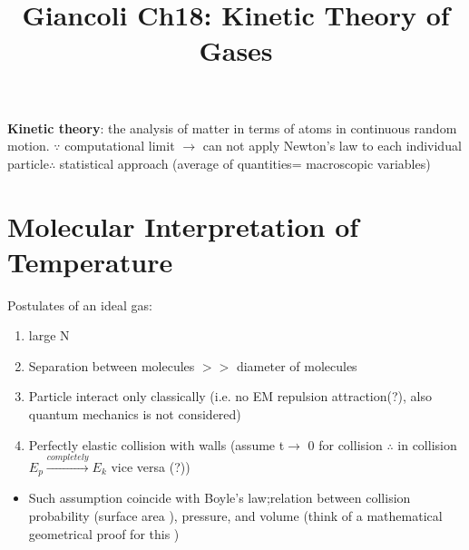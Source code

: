 \documentclass[12 pt, twoside, a4paper] {article}
\begin{document}
\title{Giancoli Ch18:  Kinetic Theory of Gases}
\date{}
\maketitle
\vspace{-50pt}
\textbf{Kinetic theory}: the analysis of matter in terms of atoms in continuous random motion.
$\because$ computational limit $\rightarrow$ can not apply Newton's law to each individual particle$\therefore$ statistical approach (average of quantities= macroscopic variables) 
\vspace{-20pt}
\section{Molecular Interpretation of Temperature}
Postulates of an ideal gas:
\begin{enumerate}
\item large N
\item Separation between molecules $>>$ diameter of molecules
\item Particle interact only classically (i.e. no EM repulsion\/ attraction(?), also quantum mechanics is not considered)
\item Perfectly elastic collision with walls (assume t$\rightarrow$ 0 for collision $\therefore$ in collision $E_p \xrightarrow{completely} E_k$ vice versa (?))
\end{enumerate}
\begin{itemize}
\item Such assumption coincide with Boyle's law;relation between collision probability (surface area ), pressure, and volume (think of a mathematical geometrical proof for this )
\end{itemize}
\end{document}
